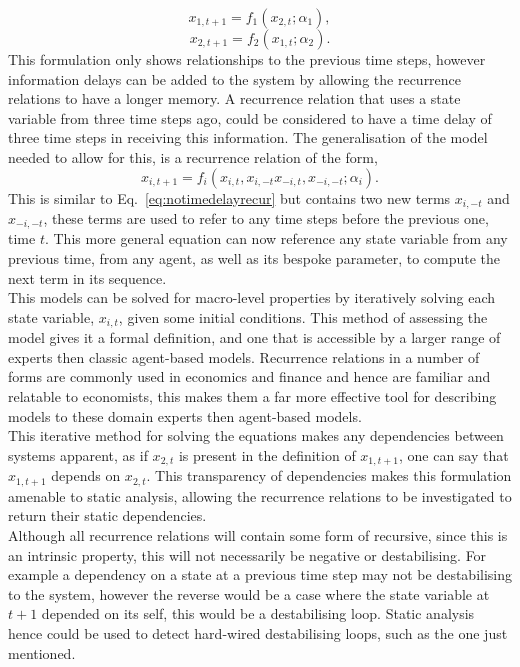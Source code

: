 \documentclass{article}
\begin{document}
\begin{equation}
x_{1, t+1} = f_{1}(x_{2,t}; \alpha_{1}),
\end{equation}
\begin{equation}
x_{2, t+1} = f_{2}(x_{1,t}; \alpha_{2}).
\end{equation}
This formulation only shows relationships to the previous time steps, however information delays can be added to the system by allowing the recurrence relations to have a longer memory. A recurrence relation that uses a state variable from three time steps ago, could be considered to have a time delay of three time steps in receiving this information. The generalisation of the model needed to allow for this, is a recurrence relation of the form, 
\begin{equation}
x_{i, t+1} = f_{i}(x_{i, t}, x_{i, -t} x_{-i,t}, x_{-i, -t}; \alpha_{i}).
\end{equation}
This is similar to Eq.~\ref{eq:notimedelayrecur} but contains two new terms $x_{i, -t}$ and $x_{-i, -t}$, these terms are used to refer to any time steps before the previous one, time $t$. This more general equation can now reference any state variable from any previous time, from any agent, as well as its bespoke parameter, to compute the next term in its sequence.\\  
This models can be solved for macro-level properties by iteratively solving each state variable, $x_{i, t}$, given some initial conditions. This method of assessing the model gives it a formal definition, and one that is accessible by a larger range of experts then classic agent-based models. Recurrence relations in a number of forms are commonly used in economics and finance and hence are familiar and relatable to economists, this makes them a far more effective tool for describing models to these domain experts then agent-based models.\\
This iterative method for solving the equations makes any dependencies between systems apparent, as if $x_{2, t}$ is present in the definition of $x_{1, t+1}$, one can say that $x_{1,t+1}$ depends on $x_{2,t}$. This transparency of dependencies makes this formulation amenable to static analysis, allowing the recurrence relations to be investigated to return their static dependencies.\\
Although all recurrence relations will contain some form of recursive, since this is an intrinsic property, this will not necessarily be negative or destabilising. For example a dependency on a state at a previous time step may not be destabilising to the system, however the reverse would be a case where the state variable at $t+1$ depended on its self, this would be a destabilising loop. Static analysis hence could be used to detect hard-wired destabilising loops, such as the one just mentioned.\\
\end{document}
